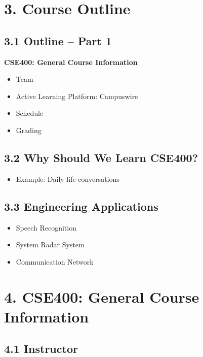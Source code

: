 \documentclass[11pt]{article}
\begin{document}
\section*{3. Course Outline}

\subsection*{3.1 Outline – Part 1}

\textbf{CSE400: General Course Information}

\begin{itemize}
    \item Team
    \item Active Learning Platform: Campuswire
    \item Schedule
    \item Grading
\end{itemize}

\subsection*{3.2 Why Should We Learn CSE400?}

\begin{itemize}
    \item Example: Daily life conversations
\end{itemize}

\subsection*{3.3 Engineering Applications}

\begin{itemize}
    \item Speech Recognition
    \item System Radar System
    \item Communication Network
\end{itemize}

\section*{4. CSE400: General Course Information}

\subsection*{4.1 Instructor}
\end{document}
